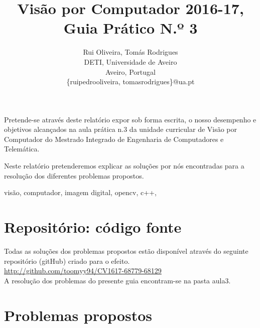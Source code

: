 \documentclass[portuguese, times, mirror]{revdetua}
\begin{document}

\title{Visão por Computador 2016-17, Guia Prático N.º 3}
\author{Rui Oliveira, Tomás Rodrigues\\ DETI, Universidade de Aveiro \\ Aveiro, Portugal \\ \{ruipedrooliveira, tomasrodrigues\}@ua.pt}
\maketitle

\begin{resumo}


Pretende-se através deste relatório expor sob forma escrita, o nosso desempenho e objetivos alcançados na aula prática n.3 da unidade curricular de Visão por Computador do Mestrado Integrado de Engenharia de Computadores e Telemática.

Neste relatório pretenderemos explicar as soluções por nós encontradas para a resolução dos diferentes problemas propostos.


\end{resumo} 

\begin{palavraschave} %
visão, computador, imagem digital, opencv, c++, 
 \end{palavraschave} %




\section{Repositório: código fonte}


Todas as soluções dos problemas propostos estão disponível através do seguinte repositório (gitHub) criado para o efeito. \\

\href{http://github.com/toomyy94/CV1617-68779-68129}{http://github.com/toomyy94/CV1617-68779-68129}
\\


A resolução dos problemas do presente guia encontram-se na pasta aula3. 



\section{Problemas propostos}
\end{document}

